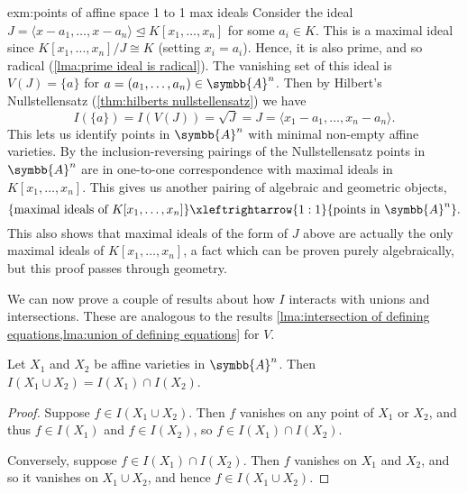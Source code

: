 \documentclass[fleqn]{NotesClass}
\newcommand{\subideal}{\trianglelefteq}
\newcommand{\affine}{\symbb{A}}
\newcommand{\isomorphic}{\cong}
\begin{document}
    \begin{exm}{}{exm:points of affine space 1 to 1 max ideals}
        Consider the ideal \(J = \langle x - a_1, \dotsc, x - a_n \rangle \subideal K[x_1, \dotsc, x_n]\) for some \(a_i \in K\).
        This is a maximal ideal since \(K[x_1, \dotsc, x_n]/J \isomorphic K\) (setting \(x_i = a_i\)).
        Hence, it is also prime, and so radical (\cref{lma:prime ideal is radical}).
        The vanishing set of this ideal is \(V(J) = \{a\}\) for \(a = (a_1, \dotsc, a_n) \in \affine^n\).
        Then by Hilbert's Nullstellensatz (\cref{thm:hilberts nullstellensatz}) we have
        \begin{equation}
            I(\{a\}) = I(V(J)) = \sqrt{J} = J = \langle x_1 - a_1, \dotsc, x_n - a_n \rangle.
        \end{equation}
        This lets us identify points in \(\affine^n\) with minimal non-empty affine varieties.
        By the inclusion-reversing pairings of the Nullstellensatz points in \(\affine^n\) are in one-to-one correspondence with maximal ideals in \(K[x_1, \dotsc, x_n]\).
        This gives us another pairing of algebraic and geometric objects,
        \begin{equation}
            \{\text{maximal ideals of } K[x_1, \dotsc, x_n]\} \xleftrightarrow{1:1} \{\text{points in } \affine^n\}.
        \end{equation}
        This also shows that maximal ideals of the form of \(J\) above are actually the only maximal ideals of \(K[x_1, \dotsc, x_n]\), a fact which can be proven purely algebraically, but this proof passes through geometry.
    \end{exm}
    
    We can now prove a couple of results about how \(I\) interacts with unions and intersections.
    These are analogous to the results \cref{lma:intersection of defining equations,lma:union of defining equations} for \(V\). 
    
    \begin{lma}{}{}
        Let \(X_1\) and \(X_2\) be affine varieties in \(\affine^n\).
        Then \(I(X_1 \cup X_2) = I(X_1) \cap I(X_2)\).
        \begin{proof}
            Suppose \(f \in I(X_1 \cup X_2)\).
            Then \(f\) vanishes on any point of \(X_1\) or \(X_2\), and thus \(f \in I(X_1)\) and \(f \in I(X_2)\), so \(f \in I(X_1) \cap I(X_2)\).
            
            Conversely, suppose \(f \in I(X_1) \cap I(X_2)\).
            Then \(f\) vanishes on \(X_1\) and \(X_2\), and so it vanishes on \(X_1 \cup X_2\), and hence \(f \in I(X_1 \cup X_2)\).
        \end{proof}
    \end{lma}
    
\end{document}
